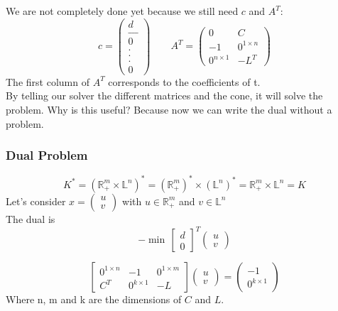 \begin{leftbar}
We are not completely done yet because we still need $c$ and $A^T$:\\
$$c = \begin{pmatrix}
d\\
\_ \_ \_ \\
0\\
. \\
. \\
. \\
0
\end{pmatrix} \qquad A^T= \begin{pmatrix}
0 & C\\
-1 & 0^{1\times n}\\
0^{n\times 1} & -L^T
\end{pmatrix}
$$
The first column of $A^T$ corresponds to the coefficients of t. \\

By telling our solver the different matrices and the cone, it will solve the problem. Why is this useful? Because now we can write the dual without a problem.

\subsubsection{Dual Problem}
$$K^*= (\mathbb{R}^m_+ \times \mathbb{L}^n)^*= (\mathbb{R}^m_+)^* \times (\mathbb{L}^n)^*= \mathbb{R}^m_+ \times \mathbb{L}^n = K$$
Let's consider $x= \begin{pmatrix}
u \\
v
\end{pmatrix} $ with $u \in \mathbb{R}^m_+$ and $v \in \mathbb{L}^n$\\
The dual is 
$$-\min \, \begin{bmatrix}
d \\
0
\end{bmatrix}^T \begin{pmatrix}
u\\
v
\end{pmatrix} $$

\begin{equation}
\begin{bmatrix}
0^{1\times n} & -1 & 0^{1\times m}\\
C^T & 0^{k\times 1} & -L
\end{bmatrix}\begin{pmatrix}
u\\
v
\end{pmatrix}=
\begin{pmatrix}
-1\\
0^{k\times 1}
\end{pmatrix}
\end{equation}
Where n, m and k are the dimensions of $C$ and $L$.
 

\end{leftbar}
